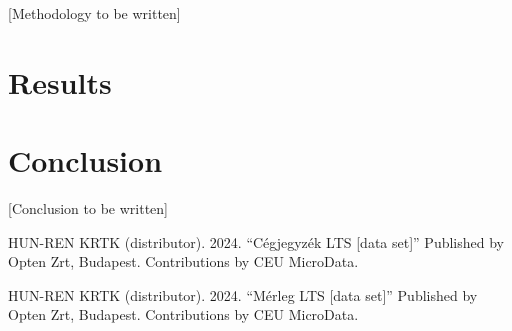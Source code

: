 \documentclass[11pt,a4paper]{article}
\begin{document}
[Methodology to be written]

\section{Results}





\section{Conclusion}

[Conclusion to be written]


\begin{thebibliography}{}

 HUN-REN KRTK (distributor). 2024. ``Cégjegyzék LTS [data set]'' Published by Opten Zrt, Budapest. Contributions by CEU MicroData.

 HUN-REN KRTK (distributor). 2024. ``Mérleg LTS [data set]'' Published by Opten Zrt, Budapest. Contributions by CEU MicroData.

\end{thebibliography}
\end{document}
